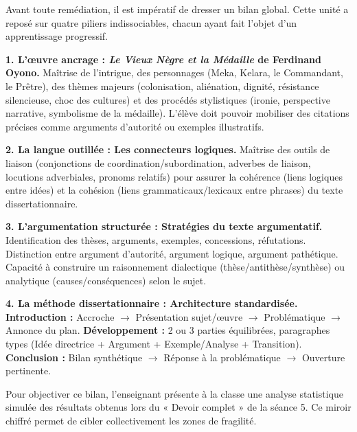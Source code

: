 \documentclass[11pt]{article}
\newcommand{\cle}[1]{{\popxbold\color{popdark}#1}}
\begin{document}
Avant toute remédiation, il est impératif de dresser un bilan global. Cette unité a reposé sur quatre piliers indissociables, chacun ayant fait l'objet d'un apprentissage progressif.

\begin{aretenir}
\textbf{1. L'œuvre ancrage : \emph{Le Vieux Nègre et la Médaille} de Ferdinand Oyono.}
Maîtrise de l'intrigue, des personnages (Meka, Kelara, le Commandant, le Prêtre), des thèmes majeurs (colonisation, aliénation, dignité, résistance silencieuse, choc des cultures) et des procédés stylistiques (ironie, perspective narrative, symbolisme de la médaille). L'élève doit pouvoir mobiliser des citations précises comme arguments d'autorité ou exemples illustratifs.

\textbf{2. La langue outillée : Les connecteurs logiques.}
Maîtrise des outils de liaison (conjonctions de coordination/subordination, adverbes de liaison, locutions adverbiales, pronoms relatifs) pour assurer la \cle{cohérence} (liens logiques entre idées) et la \cle{cohésion} (liens grammaticaux/lexicaux entre phrases) du texte dissertationnaire.

\textbf{3. L'argumentation structurée : Stratégies du texte argumentatif.}
Identification des thèses, arguments, exemples, concessions, réfutations. Distinction entre argument d'autorité, argument logique, argument pathétique. Capacité à construire un \cle{raisonnement dialectique} (thèse/antithèse/synthèse) ou \cle{analytique} (causes/conséquences) selon le sujet.

\textbf{4. La méthode dissertationnaire : Architecture standardisée.}
\textbf{Introduction :} Accroche $\rightarrow$ Présentation sujet/œuvre $\rightarrow$ Problématique $\rightarrow$ Annonce du plan.
\textbf{Développement :} 2 ou 3 parties équilibrées, paragraphes types (Idée directrice + Argument + Exemple/Analyse + Transition).
\textbf{Conclusion :} Bilan synthétique $\rightarrow$ Réponse à la problématique $\rightarrow$ Ouverture pertinente.
\end{aretenir}

Pour objectiver ce bilan, l'enseignant présente à la classe une analyse statistique simulée des résultats obtenus lors du « Devoir complet » de la séance 5. Ce miroir chiffré permet de cibler collectivement les zones de fragilité.
\end{document}
